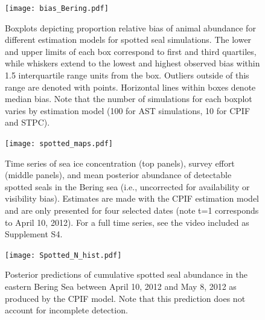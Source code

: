 \documentclass[times,mee,doublespace,]{besauth2}
\begin{document}
\begin{figure}
\begin{center}
\texttt{[image: bias\_Bering.pdf]}
\caption{Boxplots depicting proportion relative bias of animal abundance for different estimation models for spotted seal simulations.  The lower and upper limits of each box correspond to first and third quartiles, while whiskers extend to the lowest and highest observed bias within 1.5 interquartile range units from the box.  Outliers outside of this range are denoted with points.  Horizontal lines within boxes denote median bias.  Note that the number of simulations for each boxplot varies by estimation model (100 for AST simulations, 10 for CPIF and STPC).
}
\label{fig:bias_spotted}
\end{center}
\end{figure}

\begin{figure}
\begin{center}
\texttt{[image: spotted\_maps.pdf]}
\caption{Time series of sea ice concentration (top panels), survey effort (middle panels), and mean posterior abundance of detectable spotted seals in the Bering sea (i.e., uncorrected for availability or visibility bias).  Estimates are made with the CPIF estimation model and are only presented for four selected dates (note t=1 corresponds to April 10, 2012).  For a full time series, see the video included as Supplement S4.}
\label{fig:spotted_maps}
\end{center}
\end{figure}

\begin{figure}
\begin{center}
\texttt{[image: Spotted\_N\_hist.pdf]}
\caption{Posterior predictions of cumulative spotted seal abundance in the eastern Bering Sea between April 10, 2012 and May 8, 2012 as produced by the CPIF model.  Note that this prediction does not account for incomplete detection.}
\label{fig:spotted_N}
\end{center}
\end{figure}
\end{document}

